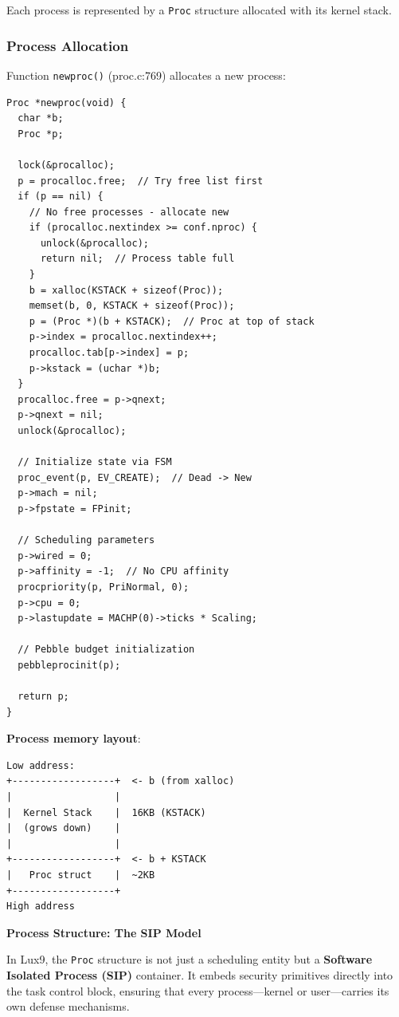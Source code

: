 \documentclass[11pt,letterpaper]{article}
\begin{document}
Each process is represented by a \texttt{Proc} structure allocated with its kernel stack.

\subsubsection{Process Allocation}

Function \texttt{newproc()} (proc.c:769) allocates a new process:

\begin{lstlisting}
Proc *newproc(void) {
  char *b;
  Proc *p;
  
  lock(&procalloc);
  p = procalloc.free;  // Try free list first
  if (p == nil) {
    // No free processes - allocate new
    if (procalloc.nextindex >= conf.nproc) {
      unlock(&procalloc);
      return nil;  // Process table full
    }
    b = xalloc(KSTACK + sizeof(Proc));
    memset(b, 0, KSTACK + sizeof(Proc));
    p = (Proc *)(b + KSTACK);  // Proc at top of stack
    p->index = procalloc.nextindex++;
    procalloc.tab[p->index] = p;
    p->kstack = (uchar *)b;
  }
  procalloc.free = p->qnext;
  p->qnext = nil;
  unlock(&procalloc);
  
  // Initialize state via FSM
  proc_event(p, EV_CREATE);  // Dead -> New
  p->mach = nil;
  p->fpstate = FPinit;
  
  // Scheduling parameters
  p->wired = 0;
  p->affinity = -1;  // No CPU affinity
  procpriority(p, PriNormal, 0);
  p->cpu = 0;
  p->lastupdate = MACHP(0)->ticks * Scaling;
  
  // Pebble budget initialization
  pebbleprocinit(p);
  
  return p;
}
\end{lstlisting}

\textbf{Process memory layout}:
\begin{verbatim}
Low address:
+------------------+  <- b (from xalloc)
|                  |
|  Kernel Stack    |  16KB (KSTACK)
|  (grows down)    |
|                  |
+------------------+  <- b + KSTACK
|   Proc struct    |  ~2KB
+------------------+
High address
\end{verbatim}

\textbf{Process Structure: The SIP Model}

In Lux9, the \texttt{Proc} structure is not just a scheduling entity but a \textbf{Software Isolated Process (SIP)} container. It embeds security primitives directly into the task control block, ensuring that every process—kernel or user—carries its own defense mechanisms.
\end{document}
